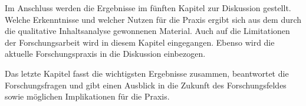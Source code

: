 Im Anschluss werden die Ergebnisse im fünften Kapitel zur Diskussion gestellt. Welche Erkenntnisse und welcher Nutzen für die Praxis ergibt sich aus dem durch die qualitative Inhaltsanalyse gewonnenen Material. Auch auf die Limitationen der Forschungsarbeit wird in diesem Kapitel eingegangen. Ebenso wird die aktuelle Forschungspraxis in die Diskussion einbezogen.

Das letzte Kapitel fasst die wichtigsten Ergebnisse zusammen, beantwortet die Forschungsfragen und gibt einen Ausblick in die Zukunft des Forschungsfeldes sowie möglichen Implikationen für die Praxis.






